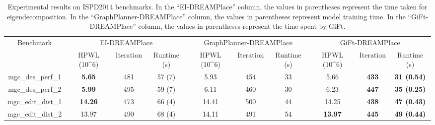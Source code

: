 \begin{table*}[]
\caption{Experimental results on ISPD2014 benchmarks. In the ``EI-DREAMPlace'' column, the values in parentheses represent the time taken for eigendecomposition. In the ``GraphPlanner-DREAMPlace'' column, the values in parentheses represent model training time. In the ``GiFt-DREAMPlace'' column, the values in parentheses represent the time spent by GiFt.} \label{tab:placement_result2}
\centering
\scriptsize
\begin{tabular}{|c||ccc|ccc|ccc|}
\hline
\multirow{2}{*}{Benchmark} & \multicolumn{3}{c|}{EI-DREAMPlace}                                                & \multicolumn{3}{c|}{GraphPlanner-DREAMPlace}                                                                                   & \multicolumn{3}{c|}{GiFt-DREAMPlace}                                                           \\ \cline{2-10} 
                           & \multicolumn{1}{c|}{HPWL (10\textasciicircum{}6)} & \multicolumn{1}{c|}{Iteration} & Runtime   (s) & \multicolumn{1}{c|}{HPWL   (10\textasciicircum{}6)} & \multicolumn{1}{c|}{Iteration} & Runtime   (s)                                            & \multicolumn{1}{c|}{HPWL   (10\textasciicircum{}6)}  & \multicolumn{1}{c|}{Iteration}    & Runtime   (s)        \\ \hline
mgc\_des\_perf\_1     & \multicolumn{1}{c|}{\textbf{5.65}}  & \multicolumn{1}{c|}{481}       & 57 (7)  & \multicolumn{1}{c|}{5.93}  & \multicolumn{1}{c|}{454}       & 33            & \multicolumn{1}{c|}{5.66}           & \multicolumn{1}{c|}{\textbf{433}} & \textbf{31 (0.54)} \\ \hline
mgc\_des\_perf\_2     & \multicolumn{1}{c|}{\textbf{5.99}}  & \multicolumn{1}{c|}{495}       & 59 (7)  & \multicolumn{1}{c|}{6.11}  & \multicolumn{1}{c|}{460}       & 30            & \multicolumn{1}{c|}{6.23}           & \multicolumn{1}{c|}{\textbf{447}} & \textbf{35 (0.25)} \\ \hline
mgc\_edit\_dist\_1    & \multicolumn{1}{c|}{\textbf{14.26}} & \multicolumn{1}{c|}{473}       & 66 (4)  & \multicolumn{1}{c|}{14.41} & \multicolumn{1}{c|}{500}       & 44            & \multicolumn{1}{c|}{14.25}          & \multicolumn{1}{c|}{\textbf{438}} & \textbf{47 (0.43)} \\ \hline
mgc\_edit\_dist\_2    & \multicolumn{1}{c|}{13.97}          & \multicolumn{1}{c|}{490}       & 68 (4)  & \multicolumn{1}{c|}{14.11} & \multicolumn{1}{c|}{491}       & 54            & \multicolumn{1}{c|}{\textbf{13.97}} & \multicolumn{1}{c|}{\textbf{445}} & \textbf{49 (0.44)} \\ \hline

\end{tabular}
\end{table*}
